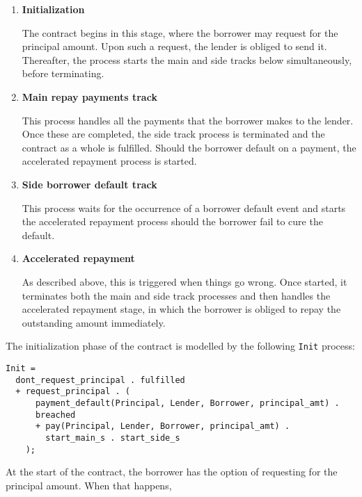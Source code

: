 \documentclass{article}
\begin{document}
\begin{enumerate}
  \item \textbf{Initialization}
  
  The contract begins in this stage, where the borrower may
  request for the principal amount.
  Upon such a request, the lender is obliged to send it.
  Thereafter, the process starts the main and side tracks below simultaneously,
  before terminating.

  \item \textbf{Main repay payments track}

  This process handles all the payments that the borrower makes to the lender.
  Once these are completed, the side track process is
  terminated and the contract as a whole is fulfilled.
  Should the borrower default on a payment, the accelerated repayment process
  is started.

  \item \textbf{Side borrower default track}

  This process waits for the occurrence of a borrower default event and starts
  the accelerated repayment process should the borrower fail to cure the
  default.

  \item \textbf{Accelerated repayment}

  As described above, this is triggered when things go wrong.
  Once started, it terminates both the main and side track processes and then
  handles the accelerated repayment stage, in which the borrower is obliged to
  repay the outstanding amount immediately.
\end{enumerate}


The initialization phase of the contract is modelled by the following
\texttt{Init} process:

\begin{verbatim}
Init =
  dont_request_principal . fulfilled
  + request_principal . (
      payment_default(Principal, Lender, Borrower, principal_amt) .
      breached
      + pay(Principal, Lender, Borrower, principal_amt) .
        start_main_s . start_side_s
    );
\end{verbatim}

At the start of the contract, the borrower has the option of requesting for
the principal amount.
When that happens,
\end{document}
